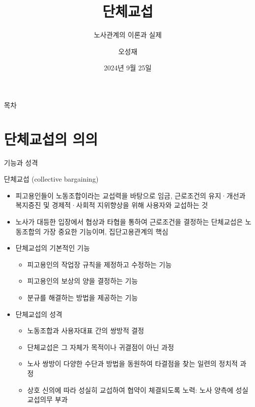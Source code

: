 \documentclass[aspectratio=169,xcolor=dvipsnames,handout]{beamer}
\title{단체교섭}
\subtitle{노사관계의 이론과 실제}
\author{오성재}
\institute[CNU]
{\relax
    충남대학교 경제학과\\
}
\date{2024년 9월 25일}
\begin{document}

\frame{\titlepage}

\begin{frame}{목차}
    \small
    \tableofcontents[hideallsubsections]
\end{frame}

\section{단체교섭의 의의}

\begin{frame}[allowframebreaks]{기능과 성격}
    \begin{block}{단체교섭 (collective bargaining)}
        \begin{itemize}[<+->]
        \item 피고용인들이 노동조합이라는 교섭력을 바탕으로 임금, 근로조건의 유지·개선과 복지증진 및 경제적·사회적 지위향상을 위해 사용자와 교섭하는 것
        \end{itemize}
    \end{block}
    \begin{itemize}[<+->]
        \item 노사가 대등한 입장에서 협상과 타협을 통하여 근로조건을 결정하는 단체교섭은 노동조합의 가장 중요한 기능이며, 집단고용관계의 핵심
        \item 단체교섭의 기본적인 기능
            \begin{itemize}[<+->]
                \item 피고용인의 작업장 규칙을 제정하고 수정하는 기능
                \item 피고용인의 보상의 양을 결정하는 기능
                \item 분규를 해결하는 방법을 제공하는 기능
            \end{itemize}
        \framebreak\relax
        \item 단체교섭의 성격
            \begin{itemize}[<+->]
                \item 노동조합과 사용자대표 간의 쌍방적 결정
                \item 단체교섭은 그 자체가 목적이나 귀결점이 아닌 과정
                \item 노사 쌍방이 다양한 수단과 방법을 동원하여 타결점을 찾는 일련의 정치적 과정
                \item 상호 신의에 따라 성실히 교섭하여 협약이 체결되도록 노력: 노사 양측에 성실교섭의무 부과
            \end{itemize}
    \end{itemize}
\end{frame}
\end{document}
